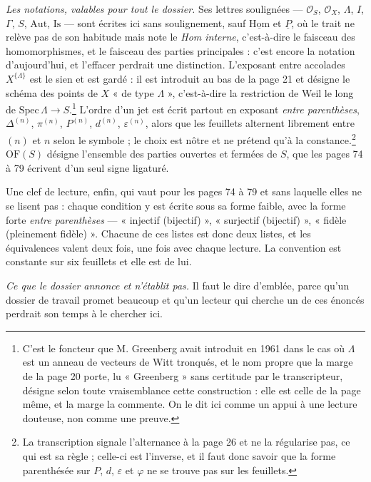 \documentclass[11pt,a4paper]{article}
\begin{document}
\emph{Les notations, valables pour tout le dossier.} Ses lettres soulignées —
$\mathcal{O}_S$, $\mathcal{O}_X$, $\Lambda$, $I$, $\Gamma$, $S$,
$\mathrm{Aut}$, $\mathrm{Is}$ — sont écrites ici sans soulignement, sauf
$\underline{\mathrm{Hom}}$ et $\underline{P}$, où le trait ne relève pas de son
habitude mais note le \emph{Hom interne}, c'est-à-dire le faisceau des
homomorphismes, et le faisceau des parties principales : c'est encore la
notation d'aujourd'hui, et l'effacer perdrait une distinction. L'exposant entre accolades $X^{\{\Lambda\}}$ est le sien et est
gardé : il est introduit au bas de la page 21 et désigne le schéma des points
de $X$ « de type $\Lambda$ », c'est-à-dire la restriction de Weil le long de
$\mathrm{Spec}\,\Lambda \to S$.\footnote{C'est le foncteur que M. Greenberg
avait introduit en 1961 dans le cas où $\Lambda$ est un anneau de vecteurs de
Witt tronqués, et le nom propre que la marge de la page 20 porte, lu
« Greenberg » sans certitude par le transcripteur, désigne selon toute
vraisemblance cette construction : elle est celle de la page même, et la marge
la commente. On le dit ici comme un appui à une lecture douteuse, non comme
une preuve.} L'ordre d'un jet est écrit partout en exposant \emph{entre
parenthèses}, $\Delta^{(n)}$, $\pi^{(n)}$, $P^{(n)}$, $d^{(n)}$,
$\varepsilon^{(n)}$, alors que les feuillets alternent librement entre $(n)$ et
$n$ selon le symbole ; le choix est nôtre et ne prétend qu'à la
constance.\footnote{La transcription signale l'alternance à la page 26 et ne la
régularise pas, ce qui est sa règle ; celle-ci est l'inverse, et il faut donc
savoir que la forme parenthésée sur $P$, $d$, $\varepsilon$ et $\varphi$ ne se
trouve pas sur les feuillets.} $\mathrm{OF}(S)$ désigne l'ensemble des parties
ouvertes et fermées de $S$, que les pages 74 à 79 écrivent d'un seul signe
ligaturé.

Une clef de lecture, enfin, qui vaut pour les pages 74 à 79 et sans laquelle
elles ne se lisent pas : chaque condition y est écrite sous sa forme faible,
avec la forme forte \emph{entre parenthèses} — « injectif (bijectif) »,
« surjectif (bijectif) », « fidèle (pleinement fidèle) ». Chacune de ces listes
est donc deux listes, et les équivalences valent deux fois, une fois avec
chaque lecture. La convention est constante sur six feuillets et elle est de
lui.

\emph{Ce que le dossier annonce et n'établit pas.} Il faut le dire d'emblée,
parce qu'un dossier de travail promet beaucoup et qu'un lecteur qui cherche un
de ces énoncés perdrait son temps à le chercher ici.
\end{document}
